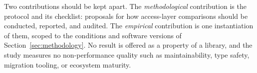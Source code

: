 Two contributions should be kept apart. The \emph{methodological} contribution is the protocol
and its checklist: proposals for how access-layer comparisons should be conducted, reported,
and audited. The \emph{empirical} contribution is one instantiation of them, scoped to the
conditions and software versions of Section~\ref{sec:methodology}. No result is offered as a
property of a library, and the study measures no non-performance quality such as maintainability,
type safety, migration tooling, or ecosystem maturity.
